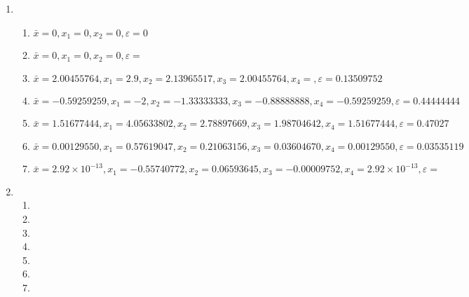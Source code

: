 \documentclass[a4paper]{article}
\providecommand{\sin}{} \renewcommand{\sin}{\hspace{2pt}\mathrm{sen}}
\begin{document}
\begin{enumerate}
\item %

  \begin{enumerate}
  \item $\bar{x}=0, x_1=0, x_2=0, \varepsilon=0$ %
  \item $\bar{x}=0, x_1=0, x_2=0, \varepsilon=$ %
  \item $\bar{x}=2.00455764, x_1=2.9, x_2=2.13965517, x_3=2.00455764, x_4=, \varepsilon=0.13509752$ %
  \item $\bar{x}=-0.59259259, x_1=-2, x_2=-1.33333333, x_3=-0.88888888, x_4=-0.59259259, \varepsilon=0.44444444$ %
  \item $\bar{x}=1.51677444, x_1=4.05633802, x_2=2.78897669, x_3=1.98704642, x_4=1.51677444, \varepsilon=0.47027$ %
  \item $\bar{x}=0.00129550, x_1=0.57619047, x_2=0.21063156, x_3=0.03604670, x_4=0.00129550, \varepsilon=0.03535119$ %
  \item $\bar{x}=2.92 \times 10^{-13},x_1=-0.55740772, x_2=0.06593645, x_3=-0.00009752, x_4=2.92 \times 10^{-13}, \varepsilon=$ %
  \end{enumerate}

\item 
  \begin{enumerate}
  \item %
  \item %
  \item %
  \item %
  \item %
  \item %
  \item %
  \end{enumerate}


\end{enumerate}
\end{document}
